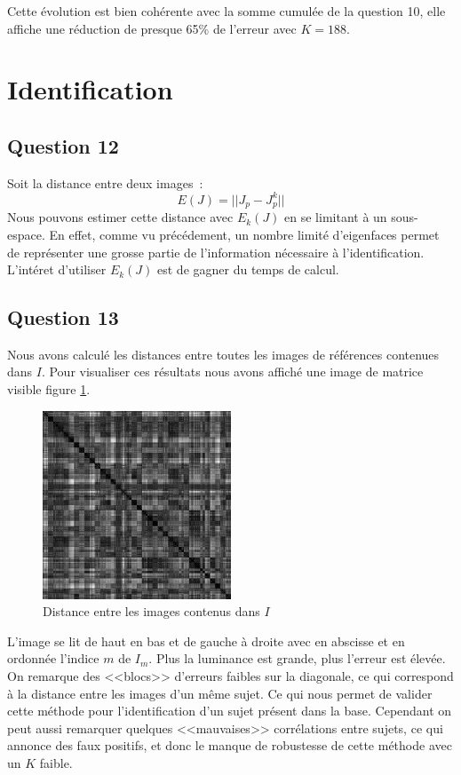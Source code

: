 \documentclass[a4paper]{article}
\begin{document}
Cette évolution est bien cohérente avec la somme cumulée de la question 10, elle affiche une réduction de 
presque 65\% de l'erreur avec $K = 188$.

\section{Identification}

\subsection{Question 12}

Soit la distance entre deux images~:
\[
    E(J) = || J_p - J_p^k ||
\]
Nous pouvons estimer cette distance avec $E_k(J)$ en se limitant à un sous-espace. 
En effet, comme vu précédement, un nombre limité d'eigenfaces permet de représenter une grosse partie de l'information
nécessaire à l'identification.
L'intéret d'utiliser $E_k(J)$ est de gagner du temps de calcul.

\subsection{Question 13}

Nous avons calculé les distances entre toutes les images de références contenues dans $I$.
Pour visualiser ces résultats nous avons affiché une image de matrice visible figure \ref{q13}.

\begin{figure}[!ht]
    \centering
    \includegraphics[width=0.5\textwidth]{img/q13_distance.png}
    \caption{Distance entre les images contenus dans $I$}
    \label{q13}
\end{figure}

L'image se lit de haut en bas et de gauche à droite avec en abscisse et en ordonnée l'indice $m$ de $I_m$.
Plus la luminance est grande, plus l'erreur est élevée. 
On remarque des <<blocs>> d'erreurs faibles sur la diagonale, ce qui correspond à la distance entre les images
d'un même sujet. Ce qui nous permet de valider cette méthode pour l'identification d'un sujet présent dans la
base. Cependant on peut aussi remarquer quelques <<mauvaises>> corrélations entre sujets, ce qui annonce des
faux positifs, et donc le manque de robustesse de cette méthode avec un $K$ faible.
\end{document}

